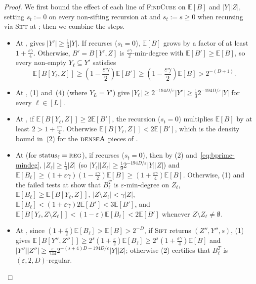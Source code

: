 \documentclass[11pt]{article}
\theoremstyle{definition}
\renewcommand{\label}[1]{}%
\newcommand{\E}{\mathbb{E}}
\newcommand{\abs}[1]{\left\lvert #1 \right\rvert}
\newcommand{\dens}[1]{\E[#1]}
\newcommand{\Sift}{\textnormal{\textsc{Sift}}}
\newcommand{\FindCube}{\textnormal{\textsc{FindCube}}}
\newcommand{\tagreg}{\textnormal{\textsc{reg}}}
\newcommand{\tagdenseA}{\textnormal{\textsc{denseA}}}
\begin{document}
\begin{proof}
We first bound the effect of each line of \FindCube{} on $\dens{B}$ and $\abs{Y}\abs{Z}$, setting $s_t := 0$ on every non-sifting recursion at  and $s_t := s \ge 0$ when recursing via \Sift{} at ; then we combine the steps.
\begin{itemize}[leftmargin=*]
    \item At ,  gives $\abs{Y'} \ge \frac{1}{3}\abs{Y}$. If  recurses ($s_t = 0$), $\dens{B}$ grows by a factor of at least $1 + \frac{\varepsilon\gamma}{4}$. Otherwise, $B' = B[Y', Z]$ is $\frac{\varepsilon\gamma}{2}$-min-degree with $\dens{B'} \ge \dens{B}$, so every non-empty $Y_\ell \subseteq Y'$ satisfies
    \begin{equation}\label{eq:bprime-mindeg}
        \dens{B[Y_\ell, Z]} \ge \left(1 - \frac{\varepsilon\gamma}{2}\right)\dens{B'} \ge \left(1 - \frac{\varepsilon\gamma}{2}\right)\dens{B} > 2^{-(D+1)}.
    \end{equation}
    \item At , (1) and~(4) (where $Y_L = Y'$) give $\abs{Y_\ell} \ge 2^{-194D/\varepsilon}\abs{Y'} \ge \frac{1}{3} 2^{-194D/\varepsilon}\abs{Y}$ for every $\ell \in [L]$.
    \item At , if $\dens{B[Y_\ell, Z]} \ge 2\dens{B'}$, the recursion ($s_t = 0$) multiplies $\dens{B}$ by at least $2 > 1 + \frac{\varepsilon\gamma}{4}$. Otherwise $\dens{B[Y_\ell, Z]} < 2\dens{B'}$, which is the density bound in~(2) for the $\tagdenseA$ pieces of .
    \item At  (for $\text{status}_\ell = \tagreg$), if  recurses ($s_t = 0$), then by (2) and~\eqref{eq:bprime-mindeg}, $\abs{Z_\ell} \ge \frac{1}{3}\abs{Z}$ (so $\abs{Y_\ell}\abs{Z_\ell} \ge \frac{1}{9} 2^{-194D/\varepsilon}\abs{Y}\abs{Z}$) and $\dens{B_\ell} \ge (1 + \varepsilon\gamma)(1 - \frac{\varepsilon\gamma}{2})\dens{B} \ge (1 + \frac{\varepsilon\gamma}{4})\dens{B}$. Otherwise, (1) and the failed tests at  show that $B_\ell^T$ is $\varepsilon$-min-degree on $Z_\ell$, $\dens{B_\ell} \ge \dens{B[Y_\ell, Z]}$, $\abs{Z \setminus Z_\ell} < \gamma\abs{Z}$, $\dens{B_\ell} < (1 + \varepsilon\gamma)2\dens{B'} < 3\dens{B'}$, and $\dens{B[Y_\ell, Z \setminus Z_\ell]} < (1 - \varepsilon)\dens{B_\ell} < 2\dens{B'}$ whenever $Z \setminus Z_\ell \ne \emptyset$.
    \item At , since $(1 + \frac{\varepsilon}{2})\dens{B_\ell} > \dens{B} > 2^{-D}$, if \Sift{} returns $(Z'', Y'', s)$, (1) gives $\dens{B[Y'', Z'']} \ge 2^s(1 + \frac{\varepsilon}{2})\dens{B_\ell} \ge 2^s(1 + \frac{\varepsilon\gamma}{4})\dens{B}$ and $\abs{Y''}\abs{Z''} \ge \frac{\varepsilon}{144} 2^{-(s+4)D - 194D/\varepsilon}\abs{Y}\abs{Z}$; otherwise (2) certifies that $B_\ell^T$ is $(\varepsilon, 2, D)$-regular.
\end{itemize}


\end{proof}
\end{document}
